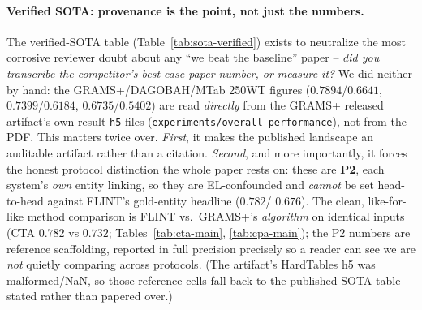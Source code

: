 \paragraph{Verified SOTA: provenance is the point, not just the numbers.}
The verified-SOTA table (Table~\ref{tab:sota-verified}) exists to neutralize the most
corrosive reviewer doubt about any ``we beat the baseline'' paper -- \emph{did you
transcribe the competitor's best-case paper number, or measure it?} We did neither by
hand: the GRAMS+/DAGOBAH/MTab 250WT figures ($0.7894$/$0.6641$, $0.7399$/$0.6184$,
$0.6735$/$0.5402$) are read \emph{directly} from the GRAMS+ released artifact's own
result \texttt{h5} files (\texttt{experiments/overall-performance}), not from the
PDF. This matters twice over. \emph{First}, it makes the published landscape an
auditable artifact rather than a citation. \emph{Second}, and more importantly, it
forces the honest protocol distinction the whole paper rests on: these are
\textbf{P2}, each system's \emph{own} entity linking, so they are EL-confounded and
\emph{cannot} be set head-to-head against FLINT's gold-entity headline ($0.782$/
$0.676$). The clean, like-for-like method comparison is FLINT vs.\ GRAMS+'s
\emph{algorithm} on identical inputs (CTA $0.782$ vs $0.732$; Tables~\ref{tab:cta-main},
\ref{tab:cpa-main}); the P2 numbers are reference scaffolding, reported in full
precision precisely so a reader can see we are \emph{not} quietly comparing across
protocols. (The artifact's HardTables h5 was malformed/NaN, so those reference cells
fall back to the published SOTA table -- stated rather than papered over.)

